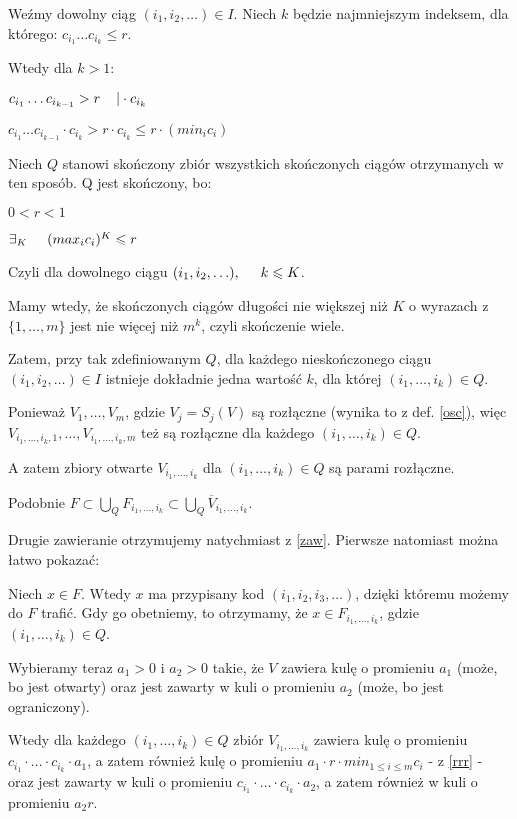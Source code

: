 \documentclass{mini}
\begin{document}
\begin{dow}
Weźmy dowolny ciąg $(i_1,i_2,\ldots) \in I$. Niech $k$ będzie najmniejszym indeksem, dla którego: $c_{i_1}\ldots c_{i_k} \leqslant r$. 

Wtedy dla $k>1$: 

$c_{i_1}\ldots c_{i_{k-1}} > r \hspace{4mm} |\cdot c_{i_k} $

$ c_{i_1}\ldots c_{i_{k-1}}\cdot c_{i_k} > r \cdot c_{i_k} \leqslant r \cdot (min_i c_i)$

Niech $Q$ stanowi skończony zbiór wszystkich skończonych ciągów otrzymanych w ten sposób. Q jest skończony, bo:

$0<r<1$

$\exists_K \hspace{5mm}  (max_i c_i)^K \leqslant r $

Czyli dla dowolnego ciągu $(i_1,i_2,\ldots), \hspace{5mm} k\leqslant K$.

Mamy wtedy, że skończonych ciągów długości nie większej niż $K$ o wyrazach z $\lbrace 1,\ldots,m\rbrace$ jest nie więcej niż $m^k$, czyli skończenie wiele.

Zatem, przy tak zdefiniowanym $Q$, dla każdego nieskończonego ciągu  $(i_1,i_2,\ldots)\in I$ istnieje dokładnie jedna wartość $k$, dla której $(i_1,\ldots,i_k) \in Q$.

Ponieważ $V_1,\ldots,V_m$, gdzie $V_j=S_j(V)$ są rozłączne (wynika to z def. \eqref{osc}), więc $V_{i_1,\ldots,i_k,1},\ldots,V_{i_1,\ldots,i_k,m}$ też są rozłączne dla każdego $(i_1,\ldots,i_k) \in Q$.

A zatem zbiory otwarte $ V_{i_1,\ldots,i_k} $ dla $(i_1,\ldots,i_k) \in Q$ są parami rozłączne.

Podobnie $ F \subset \bigcup_Q F_{i_1,\ldots,i_k} \subset \bigcup_Q \overline{V}_{i_1,\ldots,i_k} $.

Drugie zawieranie otrzymujemy natychmiast z \eqref{zaw}. Pierwsze natomiast można łatwo pokazać:

Niech $x \in F$. Wtedy $x$ ma przypisany kod $ (i_1,i_2,i_3,\ldots) $, dzięki któremu możemy do $F$ trafić. Gdy go obetniemy, to otrzymamy, że $x \in F_{i_1,\ldots,i_k}$, gdzie $(i_1,\ldots,i_k)\in Q$.

Wybieramy teraz $a_1>0$ i $a_2>0$ takie, że $V$ zawiera kulę o promieniu $a_1$ (może, bo jest otwarty) oraz jest zawarty w kuli o promieniu $a_2$ (może, bo jest ograniczony).

Wtedy dla każdego $ (i_1,\ldots,i_k)\in Q $ zbiór $V_{i_1,\ldots,i_k}$ zawiera kulę o promieniu $c_{i_1}\cdot\ldots\cdot c_{i_k}\cdot a_1$, a zatem również kulę o promieniu $a_1\cdot r\cdot min_{1\leqslant i \leqslant m} c_i$ - z \eqref{rrr} - oraz jest zawarty w kuli o promieniu $c_{i_1}\cdot\ldots\cdot c_{i_k}\cdot a_2$, a zatem również w kuli o promieniu $a_2 r$.


\end{dow}
\end{document}
